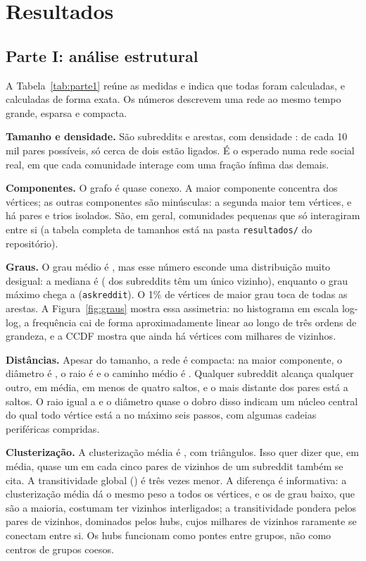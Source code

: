 \IfFileExists{webmedia.cls}{\webmediatrue\documentclass[sigconf]{webmedia}}{\documentclass[sigconf]{acmart}}
\begin{document}
\section{Resultados}

\subsection{Parte I: análise estrutural}
A Tabela~\ref{tab:parte1} reúne as medidas e indica que todas foram calculadas, e calculadas de forma
exata. Os números descrevem uma rede ao mesmo tempo grande, esparsa e compacta.

\textbf{Tamanho e densidade.} São \nVertices{} subreddits e \nArestas{} arestas, com densidade
\densidade: de cada 10 mil pares possíveis, só cerca de dois estão ligados. É o esperado numa rede
social real, em que cada comunidade interage com uma fração ínfima das demais.

\textbf{Componentes.} O grafo é quase conexo. A maior componente concentra \fracLCC{} dos vértices;
as outras \nComponentes{} componentes são minúsculas: a segunda maior tem \segundaComp{} vértices, e
há \compPares{} pares e \compTrios{} trios isolados. São, em geral, comunidades pequenas que só
interagiram entre si (a tabela completa de tamanhos está na pasta \texttt{resultados/} do repositório).

\textbf{Graus.} O grau médio é \grauMedio, mas esse número esconde uma distribuição muito desigual:
a mediana é \grauMediana{} (\fracGrauUm{} dos subreddits têm um único vizinho), enquanto o grau máximo
chega a \grauMax{} (\texttt{askreddit}). O 1\% de vértices de maior grau toca \fracArestasTop{} de
todas as arestas. A Figura~\ref{fig:graus} mostra essa assimetria: no histograma em escala log-log, a
frequência cai de forma aproximadamente linear ao longo de três ordens de grandeza, e a CCDF mostra que
ainda há vértices com milhares de vizinhos.

\textbf{Distâncias.} Apesar do tamanho, a rede é compacta: na maior componente, o diâmetro é
\diametro, o raio é \raio{} e o caminho médio é \caminhoMedio. Qualquer subreddit alcança qualquer outro,
em média, em menos de quatro saltos, e o mais distante dos pares está a \diametro{} saltos. O raio igual
a \raio{} e o diâmetro quase o dobro disso indicam um núcleo central do qual todo vértice está a no
máximo seis passos, com algumas cadeias periféricas compridas.

\textbf{Clusterização.} A clusterização média é \clustMedio, com \nTriangulos{} triângulos. Isso quer
dizer que, em média, quase um em cada cinco pares de vizinhos de um subreddit também se cita. A
transitividade global (\transitividade) é três vezes menor. A diferença é informativa: a clusterização
média dá o mesmo peso a todos os vértices, e os de grau baixo, que são a maioria, costumam ter vizinhos
interligados; a transitividade pondera pelos pares de vizinhos, dominados pelos hubs, cujos milhares de
vizinhos raramente se conectam entre si. Os hubs funcionam como pontes entre grupos, não como centros
de grupos coesos.
\end{document}
